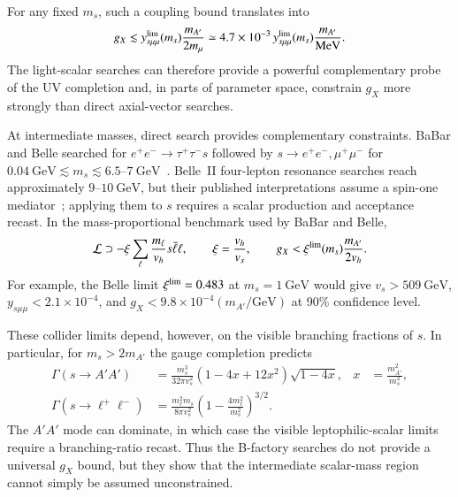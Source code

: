 \documentclass[onecolumn, aps, nofootinbib, prd, preprint, floats, floatfix, amsmath, amssymb, superscriptaddress, preprintnumbers]{revtex4-2}
\begin{document}
For any fixed $m_s$, such a coupling bound translates into
\begin{equation}
g_X\lesssim y_{s\mu\mu}^{\rm lim}(m_s)\frac{m_{A'}}{2m_\mu}
\simeq4.7\times10^{-3}\,y_{s\mu\mu}^{\rm lim}(m_s)
\frac{m_{A'}}{\mathrm{MeV}}.
\label{eq:scalar-limit-to-gx}
\end{equation}
The light-scalar searches can therefore provide a powerful complementary probe of the UV completion and, in parts of parameter space, constrain $g_X$ more strongly than direct axial-vector searches.



At intermediate masses, direct search provides complementary constraints. BaBar and Belle searched for $e^+e^-\to\tau^+\tau^-s$ followed by $s\to e^+e^-,\mu^+\mu^-$ for $0.04~\mathrm{GeV}\lesssim m_s\lesssim6.5$--$7~\mathrm{GeV}$~\cite{BaBar:2020jma,Belle:2022gbl}. Belle~II four-lepton resonance searches reach approximately $9$--$10~\mathrm{GeV}$, but their published interpretations assume a spin-one mediator~\cite{Belle-II:2024wtd,Belle-II:2023ydz}; applying them to $s$ requires a scalar production and acceptance recast. In the mass-proportional benchmark used by BaBar and Belle,
\begin{equation}
\mathcal L\supset-\xi\sum_\ell\frac{m_\ell}{v_h}s\bar\ell\ell,
\qquad
\xi=\frac{v_h}{v_s},
\qquad
g_X<\xi^{\rm lim}(m_s)\frac{m_{A'}}{2v_h}.
\label{eq:scalar-collider-map}
\end{equation}
For example, the Belle limit $\xi^{\rm lim}=0.483$ at $m_s=1~\mathrm{GeV}$ would give $v_s>509~\mathrm{GeV}$, $y_{s\mu\mu}<2.1\times10^{-4}$, and $g_X<9.8\times10^{-4}(m_{A'}/\mathrm{GeV})$ at 90\% confidence level.

These collider limits depend, however, on the visible branching fractions of $s$. In particular, for $m_s>2m_{A'}$ the gauge completion predicts
\begin{equation}
\begin{aligned}
\Gamma(s\to A'A')&=\frac{m_s^3}{32\pi v_s^2}
\left(1-4x+12x^2\right)\sqrt{1-4x},
&x&=\frac{m_{A'}^2}{m_s^2},\\
\Gamma(s\to\ell^+\ell^-)&=\frac{m_\ell^2m_s}{8\pi v_s^2}
\left(1-\frac{4m_\ell^2}{m_s^2}\right)^{3/2}.
\end{aligned}
\label{eq:scalar-partial-widths}
\end{equation}
The $A'A'$ mode can dominate, in which case the visible leptophilic-scalar limits require a branching-ratio recast. Thus the B-factory searches do not provide a universal $g_X$ bound, but they show that the intermediate scalar-mass region cannot simply be assumed unconstrained.
\end{document}
